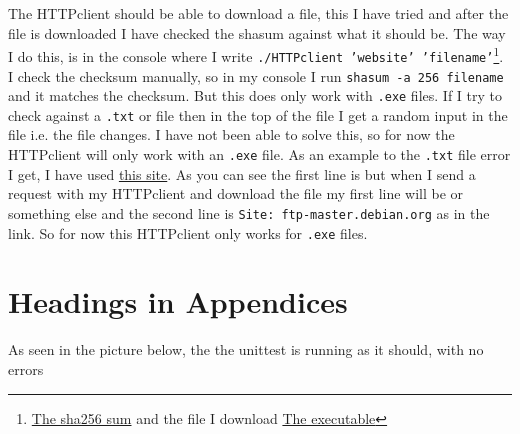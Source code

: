 \documentclass{sig-alternate-05-2015}
\begin{document}
The HTTPclient should be able to download a file, this I have tried and after the file is downloaded I have checked the shasum against what it should be.
The way I do this, is in the console where I write \texttt{./HTTPclient 'website' 'filename'}\footnote{\href{https://download.jetbrains.com/python/pycharm-community-2016.1.3.exe.sha256}{The sha256 sum} and the file I download \href{http://download.jetbrains.com/python/pycharm-community-2016.1.3.exe}{The executable}}. I check the checksum manually, so in my console I run \texttt{shasum -a 256 filename} and it matches the checksum.
But this does only work with \texttt{.exe} files. If I try to check against a \texttt{.txt} or  file then in the top of the file I get a random input in the file i.e. the file changes. I have not been able to solve this, so for now the HTTPclient will only work with an \texttt{.exe} file. As an example to the \texttt{.txt} file error I get, I have used \href{http://anonscm.debian.org/viewvc/webwml/webwml/english/mirror/Mirrors.masterlist?view=co}{this site}. As you can see the first line is  but when I send a request with my HTTPclient and download the file my first line will be  or something else and the second line is \texttt{Site: ftp-master.debian.org} as in the link. So for now this HTTPclient only works for \texttt{.exe} files.

\appendix
\section{Headings in Appendices}
As seen in the picture below, the the unittest is running as it should, with no errors
 
\newpage



\end{document}
